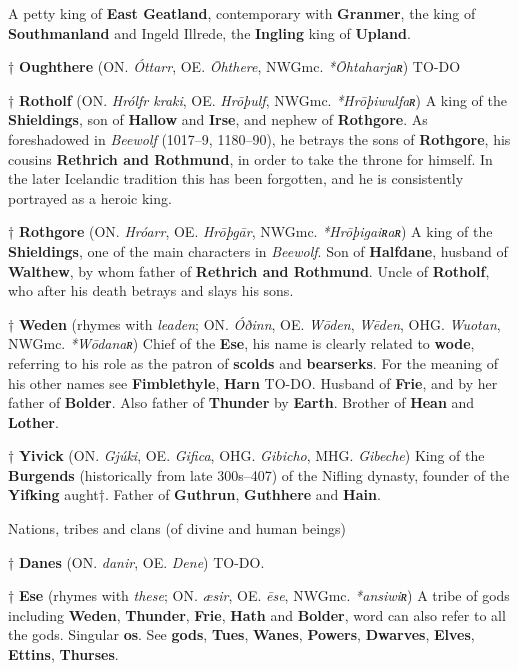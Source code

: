  A petty king of \textbf{East Geatland}, contemporary with \textbf{Granmer}, the king of \textbf{Southmanland} and Ingeld Illrede, the \textbf{Ingling} king of \textbf{Upland}.
 
† \textbf{Oughthere} (ON. \emph{Óttarr}, OE. \emph{Ōhthere}, NWGmc. \emph{*Ōhtaharjaʀ})
 TO-DO
 
† \textbf{Rotholf} (ON. \emph{Hrólfr kraki}, OE. \emph{Hrōþulf}, NWGmc. \emph{*Hrōþiwulfaʀ})
 A king of the \textbf{Shieldings}, son of \textbf{Hallow} and \textbf{Irse}, and nephew of \textbf{Rothgore}. As foreshadowed in \emph{Beewolf} (1017–9, 1180–90), he betrays the sons of \textbf{Rothgore}, his cousins \textbf{Rethrich and Rothmund}, in order to take the throne for himself. In the later Icelandic tradition this has been forgotten, and he is consistently portrayed as a heroic king.
 
† \textbf{Rothgore} (ON. \emph{Hróarr}, OE. \emph{Hrōþgār}, NWGmc. \emph{*Hrōþigaiʀaʀ})
 A king of the \textbf{Shieldings}, one of the main characters in \emph{Beewolf}. Son of \textbf{Halfdane}, husband of \textbf{Walthew}, by whom father of \textbf{Rethrich and Rothmund}. Uncle of \textbf{Rotholf}, who after his death betrays and slays his sons.
 
† \textbf{Weden} (rhymes with \emph{leaden}; ON. \emph{Óðinn}, OE. \emph{Wōden}, \emph{Wēden}, OHG. \emph{Wuotan}, NWGmc. \emph{*Wōdanaʀ})
 Chief of the \textbf{Ese}, his name is clearly related to \textbf{wode}, referring to his role as the patron of \textbf{scolds} and \textbf{bearserks}. For the meaning of his other names see \textbf{Fimblethyle}, \textbf{Harn} TO-DO. Husband of \textbf{Frie}, and by her father of \textbf{Bolder}. Also father of \textbf{Thunder} by \textbf{Earth}. Brother of \textbf{Hean} and \textbf{Lother}.

† \textbf{Yivick} (ON. \emph{Gjúki}, OE. \emph{Gifica}, OHG. \emph{Gibicho}, MHG. \emph{Gibeche})
 King of the \textbf{Burgends} (historically from late 300s–407) of the Nifling dynasty, founder of the \textbf{Yifking} aught†. Father of \textbf{Guthrun}, \textbf{Guthhere} and \textbf{Hain}.



Nations, tribes and clans (of divine and human beings)

† \textbf{Danes} (ON. \emph{danir}, OE. \emph{Dene})
 TO-DO.

† \textbf{Ese} (rhymes with \emph{these}; ON. \emph{æsir}, OE. \emph{ēse}, NWGmc. \emph{*ansiwiʀ})
 A tribe of gods including \textbf{Weden}, \textbf{Thunder}, \textbf{Frie}, \textbf{Hath} and \textbf{Bolder}, word can also refer to all the gods. Singular \textbf{os}. See \textbf{gods}, \textbf{Tues}, \textbf{Wanes}, \textbf{Powers}, \textbf{Dwarves}, \textbf{Elves}, \textbf{Ettins}, \textbf{Thurses}.
 
